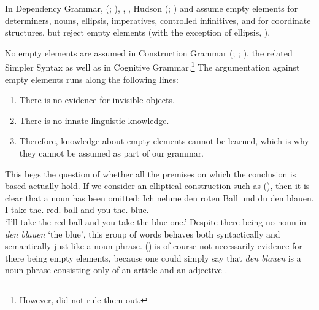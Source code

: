 In Dependency Grammar, \mel (\citeyear[]{Melcuk88a-u}; \citeyear[]{Melcuk2003a-u}),
\citet[]{Starosta88a-u}, \citet[--472]{Eroms2000a}, Hudson (\citeyear[Section~3.7]{Hudson2007a-u}; \citeyear[]{Hudson2010a-u}) and
\citet{Engel2014a} assume empty elements for determiners, nouns, ellipsis, imperatives, controlled infinitives, and for coordinate
structures, but \citet[]{GO2009a} reject empty elements (with the exception of ellipsis, \citealp{Osborne2016a-u}).

No empty elements are assumed in Construction Grammar\indexcxg\label{Seite-leere-Elemente-CxG} (\citealp[--50]{MR2001a}; \citealp[]{Goldberg2003b}; \citealp[]{Goldberg2006a}), the related Simpler Syntax \citep{CJ2005a} as well as in Cognitive Grammar.\footnote{
  However, \citet[]{Fillmore88a} did not rule them out.
} 
The argumentation against empty elements runs along the following lines:
\begin{enumerate}
\item There is no evidence for invisible objects.
\item There is no innate linguistic knowledge.
\item Therefore, knowledge about empty elements cannot be learned, which is why they cannot be assumed
as part of our grammar.
\end{enumerate}
This begs the question of whether all the premises on which the conclusion is based actually hold. If we consider an elliptical
construction such as (), then it is clear that a noun has been omitted:
\ea
\gll Ich nehme den roten Ball und du den blauen.\\
	 I take the.\acc{} red.\acc{} ball and you the.\acc{} blue.\acc{}\\
\glt `I'll take the red ball and you take the blue one.'
\z
Despite there being no noun in \emph{den blauen} `the blue', this group of words behaves both syntactically and semantically just like a noun
phrase. () is of course not necessarily evidence for there being empty elements, because one could simply say that \emph{den blauen}
is a noun phrase consisting only of an article and an adjective \citep{Wunderlich87d}. 


